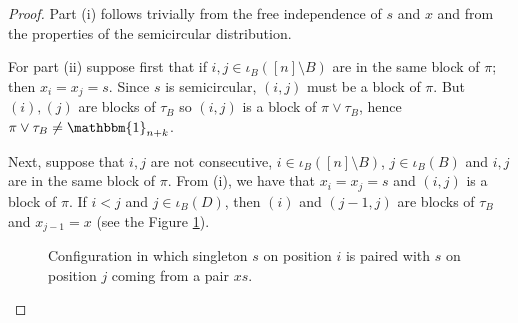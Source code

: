 \documentclass{amsart}
\begin{document}
\begin{proof}
  Part (i) follows trivially from the free independence of $ s $ and $ x $ and from the properties of the semicircular distribution.
  
   For part (ii) suppose first that if 
  $ i, j \in \iota_B([n]\setminus B ) $
   are in the same block of
    $\pi $; 
    then
     $x_i = x_j = s $.
      Since $ s $ is semicircular,
       $ (i, j)$ 
       must be a block of $\pi$. But
  $ (i), (j)$
   are blocks of $ \tau_B $ so
   $(i, j)$ 
   is a block of 
   $ \pi \vee \tau_B $,
    hence
   $ \pi \vee \tau_B \neq \mathbbm{1}_{n+k}  $.
   
    Next, suppose that $ i, j $ are not consecutive, $ i \in \iota_B ([n]\setminus B ) $, $ j \in \iota_B (B) $ and $ i, j $ are in the same block of $ \pi $. 
    From (i), we have that $ x_i=x_j = s $ and $ (i, j) $ is a block of $ \pi $. 
    If $ i < j $ and 
    $ j \in \iota_B( D )$, then $(i)$ and $(j-1, j)$ are blocks of $ \tau_B $ and $ x_{j-1} = x $ (see the Figure \ref{fig:2}).
    \begin{center}
\begin{figure}[H]
\caption{Configuration in which singleton $s$ on position $i$ is paired with $s$ on position $j$ coming from a pair $xs$.}
\label{fig:2}
\end{figure}

     \end{center}
    

\end{proof}
\end{document}
